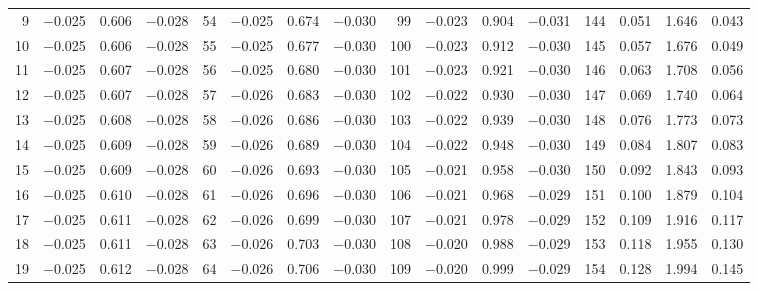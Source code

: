 \begin{table}[!h]
{\begin{tabular}{rrrr|rrrr|rrrr|crrr}
  9 & \tiny{ $-$0.025} &   0.606 & \tiny{ $-$0.028} &  54 & \tiny{ $-$0.025} &   0.674 & \tiny{ $-$0.030} &  99 & \tiny{ $-$0.023} &   0.904 & \tiny{ $-$0.031} & 144 & \tiny{  0.051} &   1.646 & \tiny{  0.043}\\
 10 & \tiny{ $-$0.025} &   0.606 & \tiny{ $-$0.028} &  55 & \tiny{ $-$0.025} &   0.677 & \tiny{ $-$0.030} & 100 & \tiny{ $-$0.023} &   0.912 & \tiny{ $-$0.030} & 145 & \tiny{  0.057} &   1.676 & \tiny{  0.049}\\
 11 & \tiny{ $-$0.025} &   0.607 & \tiny{ $-$0.028} &  56 & \tiny{ $-$0.025} &   0.680 & \tiny{ $-$0.030} & 101 & \tiny{ $-$0.023} &   0.921 & \tiny{ $-$0.030} & 146 & \tiny{  0.063} &   1.708 & \tiny{  0.056}\\
 12 & \tiny{ $-$0.025} &   0.607 & \tiny{ $-$0.028} &  57 & \tiny{ $-$0.026} &   0.683 & \tiny{ $-$0.030} & 102 & \tiny{ $-$0.022} &   0.930 & \tiny{ $-$0.030} & 147 & \tiny{  0.069} &   1.740 & \tiny{  0.064}\\
 13 & \tiny{ $-$0.025} &   0.608 & \tiny{ $-$0.028} &  58 & \tiny{ $-$0.026} &   0.686 & \tiny{ $-$0.030} & 103 & \tiny{ $-$0.022} &   0.939 & \tiny{ $-$0.030} & 148 & \tiny{  0.076} &   1.773 & \tiny{  0.073}\\
 14 & \tiny{ $-$0.025} &   0.609 & \tiny{ $-$0.028} &  59 & \tiny{ $-$0.026} &   0.689 & \tiny{ $-$0.030} & 104 & \tiny{ $-$0.022} &   0.948 & \tiny{ $-$0.030} & 149 & \tiny{  0.084} &   1.807 & \tiny{  0.083}\\
 15 & \tiny{ $-$0.025} &   0.609 & \tiny{ $-$0.028} &  60 & \tiny{ $-$0.026} &   0.693 & \tiny{ $-$0.030} & 105 & \tiny{ $-$0.021} &   0.958 & \tiny{ $-$0.030} & 150 & \tiny{  0.092} &   1.843 & \tiny{  0.093}\\
 16 & \tiny{ $-$0.025} &   0.610 & \tiny{ $-$0.028} &  61 & \tiny{ $-$0.026} &   0.696 & \tiny{ $-$0.030} & 106 & \tiny{ $-$0.021} &   0.968 & \tiny{ $-$0.029} & 151 & \tiny{  0.100} &   1.879 & \tiny{  0.104}\\
 17 & \tiny{ $-$0.025} &   0.611 & \tiny{ $-$0.028} &  62 & \tiny{ $-$0.026} &   0.699 & \tiny{ $-$0.030} & 107 & \tiny{ $-$0.021} &   0.978 & \tiny{ $-$0.029} & 152 & \tiny{  0.109} &   1.916 & \tiny{  0.117}\\
 18 & \tiny{ $-$0.025} &   0.611 & \tiny{ $-$0.028} &  63 & \tiny{ $-$0.026} &   0.703 & \tiny{ $-$0.030} & 108 & \tiny{ $-$0.020} &   0.988 & \tiny{ $-$0.029} & 153 & \tiny{  0.118} &   1.955 & \tiny{  0.130}\\
 19 & \tiny{ $-$0.025} &   0.612 & \tiny{ $-$0.028} &  64 & \tiny{ $-$0.026} &   0.706 & \tiny{ $-$0.030} & 109 & \tiny{ $-$0.020} &   0.999 & \tiny{ $-$0.029} & 154 & \tiny{  0.128} &   1.994 & \tiny{  0.145}\\

\end{tabular}}
\end{table}
